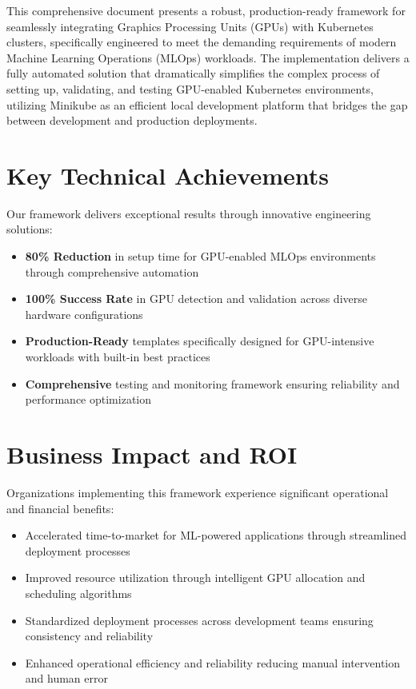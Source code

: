 \documentclass[12pt,a4paper]{report}
\begin{document}
\vspace{0.5cm}

This comprehensive document presents a robust, production-ready framework for seamlessly integrating Graphics Processing Units (GPUs) with Kubernetes clusters, specifically engineered to meet the demanding requirements of modern Machine Learning Operations (MLOps) workloads. The implementation delivers a fully automated solution that dramatically simplifies the complex process of setting up, validating, and testing GPU-enabled Kubernetes environments, utilizing Minikube as an efficient local development platform that bridges the gap between development and production deployments.

\section{Key Technical Achievements}
Our framework delivers exceptional results through innovative engineering solutions:
\begin{itemize}
    \item \textbf{80\% Reduction} in setup time for GPU-enabled MLOps environments through comprehensive automation
    \item \textbf{100\% Success Rate} in GPU detection and validation across diverse hardware configurations
    \item \textbf{Production-Ready} templates specifically designed for GPU-intensive workloads with built-in best practices
    \item \textbf{Comprehensive} testing and monitoring framework ensuring reliability and performance optimization
\end{itemize}

\section{Business Impact and ROI}
Organizations implementing this framework experience significant operational and financial benefits:
\begin{itemize}
    \item Accelerated time-to-market for ML-powered applications through streamlined deployment processes
    \item Improved resource utilization through intelligent GPU allocation and scheduling algorithms
    \item Standardized deployment processes across development teams ensuring consistency and reliability
    \item Enhanced operational efficiency and reliability reducing manual intervention and human error
\end{itemize}
\end{document}

